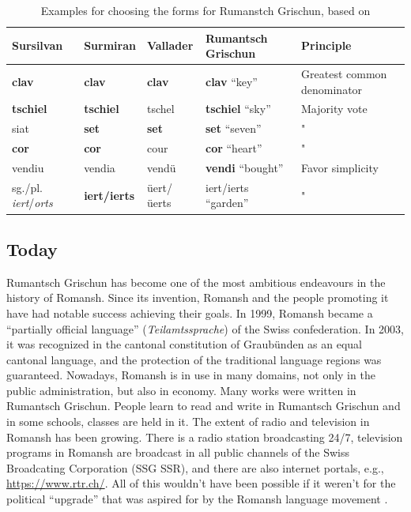 \begin{table}
\centering
\begin{tabular}{lllll}
\toprule
Sursilvan & Surmiran & Vallader & Rumantsch Grischun & Principle \\
\midrule
\textbf{clav}	  &  \textbf{clav}    &  \textbf{clav}    & \textbf{clav}  \enquote{key}  & Greatest common denominator \\
\textbf{tschiel}       &   \textbf{tschiel}   & tschel      & \textbf{tschiel} \enquote{sky} & Majority vote \\
siat 	 & \textbf{set}      & \textbf{set}      & \textbf{set} \enquote{seven} & " \\
\textbf{cor} & \textbf{cor} & cour & \textbf{cor} \enquote{heart} & " \\
vendiu & vendia & vendü & \textbf{vendi} \enquote{bought} & Favor simplicity \\
sg./pl. \emph{iert}/\emph{orts} & \textbf{iert/ierts} & üert/üerts & iert/ierts \enquote{garden} & " \\
\bottomrule

\end{tabular}
\caption[Examples for choosing the forms for Rumanstch Grischun]{Examples for choosing the forms for Rumanstch Grischun, based on \cite[70-71]{liver1999}}
\label{tab:rg-examples}
\end{table}


\subsection{Today}
Rumantsch Grischun has become one of the most ambitious endeavours in the history of Romansh. 
Since its invention, Romansh and the people promoting it have had notable success achieving their goals. 
In 1999, Romansh became a \enquote{partially official language} (\emph{Teilamtssprache}) of the Swiss confederation. 
In 2003, it was recognized in the cantonal constitution of Graubünden as an equal cantonal language, and the protection of the traditional language regions was guaranteed.
Nowadays, Romansh is in use in many domains, not only in the public administration, but also in economy. 
Many works were written in Rumantsch Grischun. 
People learn to read and write in Rumantsch Grischun and in some schools, classes are held in it. 
The extent of radio and television in Romansh has been growing. 
There is a radio station broadcasting 24/7, television programs in Romansh are broadcast in all public channels of the Swiss Broadcating Corporation (SSG SSR), and there are also internet portals, e.g., \url{https://www.rtr.ch/}. All of this wouldn't have been possible if it weren't for the political \enquote{upgrade} that was aspired for by the Romansh language movement \autocite{cathomas2012}.

